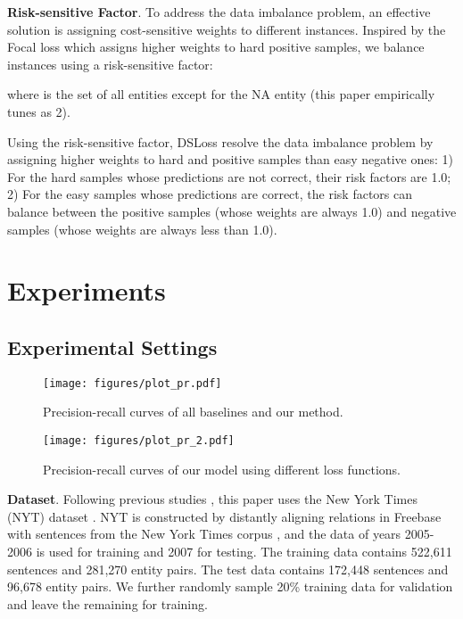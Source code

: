 \documentclass[11pt,a4paper]{article}
\begin{document}
  \textbf{Risk-sensitive Factor}.
  To address the data imbalance problem, an effective solution is assigning cost-sensitive weights to different instances. Inspired by the Focal loss \cite{lin_focal_2018} which assigns higher weights to hard positive samples, we balance instances using a risk-sensitive factor:
  
  \noindent where  is the set of all entities except for the NA entity (this paper empirically tunes  as 2).
  
  Using the risk-sensitive factor, DSLoss resolve the data imbalance problem by assigning higher weights to hard and positive samples than easy negative ones:
  1) For the hard samples whose predictions are not correct, their risk factors are  1.0;
  2) For the easy samples whose predictions are correct, the risk factors can balance between the positive samples (whose weights are always 1.0) and negative samples (whose weights are always less than 1.0).
  
  \section{Experiments}
  
  \subsection{Experimental Settings}
  
  \begin{figure*}[!htp]
    \begin{minipage}[b]{0.95\columnwidth}
      \setlength{\abovecaptionskip}{-0.1em}
      \setlength{\belowcaptionskip}{-0.5em}
      \centering
      \texttt{[image: figures/plot\_pr.pdf]}
      \caption{Precision-recall curves of all baselines and our method.}
      \label{fig:held-out}
    \end{minipage}
    \hspace{2em}
    \begin{minipage}[b]{0.95\columnwidth}
      \setlength{\abovecaptionskip}{-0.1em}
      \setlength{\belowcaptionskip}{-0.5em}
      \centering  
      \texttt{[image: figures/plot\_pr\_2.pdf]}
      \caption{Precision-recall curves of our model using different loss functions.}
      \label{fig:ablation}
    \end{minipage}
  \end{figure*}
  
  \textbf{Dataset}.
  Following previous studies \cite{riedel_modeling_2010,lin_neural_2016}, this paper uses the New York Times (NYT) dataset \cite{riedel_modeling_2010}. NYT is constructed by distantly aligning relations in Freebase with sentences from the New York Times corpus \cite{bollacker_freebase_2008}, and the data of years 2005-2006 is used for training and 2007 for testing.
  The training data contains 522,611 sentences and 281,270 entity pairs.
  The test data contains 172,448 sentences and 96,678 entity pairs.
  We further randomly sample 20\% training data for validation and leave the remaining for training.
  
\end{document}
